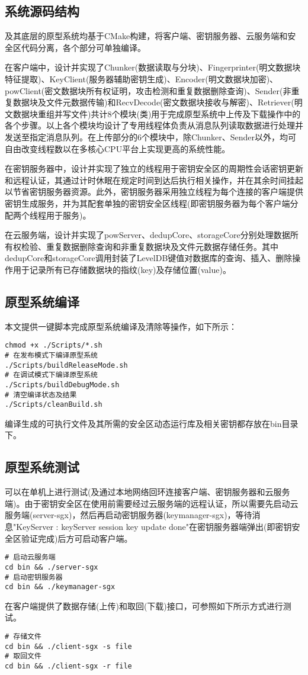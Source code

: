 \subsection*{系统源码结构}

\prototype 及其底层的\sysnameS 原型系统均基于CMake构建，将客户端、密钥服务器、云服务端和安全区代码分离，各个部分可单独编译。

在客户端中，设计并实现了Chunker(数据读取与分块)、Fingerprinter(明文数据块特征提取)、KeyClient(服务器辅助密钥生成)、Encoder(明文数据块加密)、powClient(密文数据块所有权证明，攻击检测和重复数据删除查询)、Sender(非重复数据块及文件元数据传输)和RecvDecode(密文数据块接收与解密)、Retriever(明文数据块重组并写文件)共计8个模块(类)用于完成原型系统中上传及下载操作中的各个步骤。以上各个模块均设计了专用线程体负责从消息队列读取数据进行处理并发送至指定消息队列。在上传部分的6个模块中，除Chunker、Sender以外，均可自由改变线程数以在多核心CPU平台上实现更高的系统性能。

在密钥服务器中，设计并实现了独立的线程用于密钥安全区的周期性会话密钥更新和远程认证，其通过计时休眠在规定时间到达后执行相关操作，并在其余时间挂起以节省密钥服务器资源。此外，密钥服务器采用独立线程为每个连接的客户端提供密钥生成服务，并为其配套单独的密钥安全区线程(即密钥服务器为每个客户端分配两个线程用于服务)。

在云服务端，设计并实现了powServer、dedupCore、storageCore分别处理数据所有权检验、重复数据删除查询和非重复数据块及文件元数据存储任务。其中dedupCore和storageCore调用封装了LevelDB键值对数据库的查询、插入、删除操作用于记录所有已存储数据块的指纹(key)及存储位置(value)。


\subsection*{原型系统编译}
本文提供一键脚本完成原型系统编译及清除等操作，如下所示：
\vspace{1pt}

\begin{lstlisting}[style=shell]
chmod +x ./Scripts/*.sh
# 在发布模式下编译原型系统
./Scripts/buildReleaseMode.sh
# 在调试模式下编译原型系统
./Scripts/buildDebugMode.sh
# 清空编译状态及结果
./Scripts/cleanBuild.sh
\end{lstlisting}

编译生成的可执行文件及其所需的安全区动态运行库及相关密钥都存放在bin目录下。

\subsection*{原型系统测试}
\prototype 可以在单机上进行测试(及通过本地网络回环连接客户端、密钥服务器和云服务端)。由于密钥安全区在使用前需要经过云服务端的远程认证，所以需要先启动云服务端(server-sgx)，然后再启动密钥服务器(keymanager-sgx)，等待消息"KeyServer : keyServer session key update done"在密钥服务器端弹出(即密钥安全区验证完成)后方可启动客户端。
\begin{lstlisting}[style=shell]
# 启动云服务端
cd bin && ./server-sgx
# 启动密钥服务器
cd bin && ./keymanager-sgx
\end{lstlisting}

\prototype 在客户端提供了数据存储(上传)和取回(下载)接口，可参照如下所示方式进行测试。

\begin{lstlisting}[style=shell]
# 存储文件
cd bin && ./client-sgx -s file
# 取回文件
cd bin && ./client-sgx -r file
\end{lstlisting}
